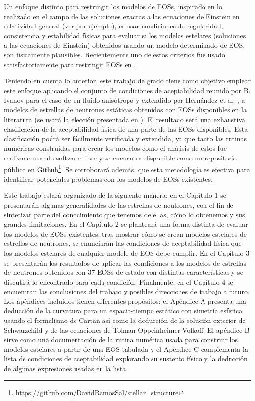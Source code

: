 Un enfoque distinto para restringir los modelos de EOSs, inspirado en lo realizado en el campo de las soluciones exactas a las ecuaciones de Einstein en relatividad general (ver \cite{Delgaty1998} por ejemplo), es usar condiciones de regularidad, consistencia y estabilidad físicas para evaluar si los modelos estelares (soluciones a las ecuaciones de Einstein) obtenidos usando un modelo determinado de EOS, son físicamente plausibles. Recientemente uno de estos criterios fue usado satisfactoriamente para restringir EOSs en \cite{Koliogiannis2019a}.

Teniendo en cuenta lo anterior, este trabajo de grado tiene como objetivo emplear este enfoque aplicando el conjunto de condiciones de aceptabilidad reunido por B. Ivanov \cite{Ivanov2017} para el caso de un fluido anisótropo y extendido por Hernández et al. \cite{Hernandez2018}, a modelos de estrellas de neutrones estáticas obtenidos con EOSs disponibles en la literatura (se usará la elección presentada en \cite{Ozel2016}). El resultado será una exhaustiva clasificación de la aceptabilidad física de una parte de las EOSs disponibles. Esta clasificación podrá ser fácilmente verificada y extendida, ya que tanto las rutinas numéricas construidas para crear los modelos como el análisis de estos fue realizado usando software libre y se encuentra disponible como un repositorio público en Github\footnote{\url{https://github.com/DavidRamosSal/stellar_structure}}. Se corroborará además, que esta metodología es efectiva para identificar potenciales problemas con los modelos de EOSs existentes. 

Este trabajo estará organizado de la siguiente manera: en el Capítulo 1 se presentarán algunas generalidades de las estrellas de neutrones, con el fin de sintetizar parte del conocimiento que tenemos de ellas, cómo lo obtenemos y sus grandes limitaciones. En el Capítulo 2 se planteará una forma distinta de evaluar los modelos de EOSs existentes: tras mostrar cómo se crean modelos estelares de estrellas de neutrones, se enunciarán las condiciones de aceptabilidad física que los modelos estelares de cualquier modelo de EOS debe cumplir. En el Capítulo 3 se presentarán los resultados de aplicar las condiciones a los modelos de estrellas de neutrones obtenidos con 37 EOSs de estado con distintas características y se discutirá lo encontrado para cada condición. Finalmente, en el Capítulo 4 se encuentran las conclusiones del trabajo y posibles direcciones de trabajo a futuro. Los apéndices incluidos tienen diferentes propósitos: el Apéndice A presenta una deducción de la curvatura para un espacio-tiempo estático con simetría esférica usando el formalismo de Cartan así como la deducción de la solución exterior de Schwarzchild y de las ecuaciones de Tolman-Oppeinheimer-Volkoff. El apéndice B sirve como una documentación de la rutina numérica usada para construir los modelos estelares a partir de una EOS tabulada y el Apéndice C complementa la lista de condiciones de aceptabilidad explorando su sustento físico y la deducción de algunas expresiones usadas en la lista.


